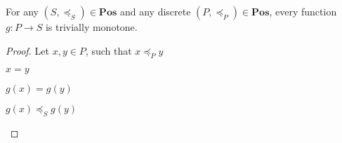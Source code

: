 \begin{lemma}\label{lemma:discrete-poset-monotone}
  For any $(S, \preceq_S)\in\mathbf{Pos}$ and any discrete $(P, \preceq_P)\in\mathbf{Pos}$, every function $g : P \to S$ is trivially monotone.

  \begin{proof}
    Let $x, y\in P$, such that $x\preceq_Py$
    \begin{itemize}
      \step[\imps] $x = y$

      \step[\imps] $g(x) = g(y)$

      \step[\imps] $g(x) \preceq_S g(y)$
        \qedhere
    \end{itemize}

  \end{proof}
\end{lemma}

